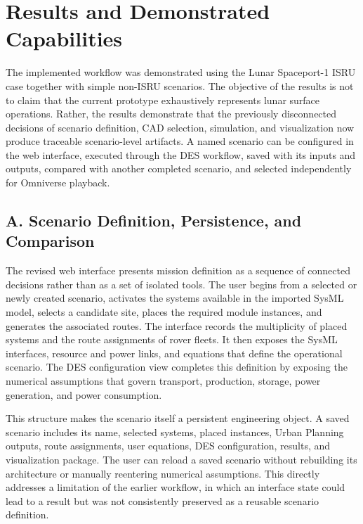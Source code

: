 
\section{Results and Demonstrated Capabilities}

The implemented workflow was demonstrated using the Lunar Spaceport-1 ISRU case together with simple non-ISRU scenarios. The objective of the results is not to claim that the current prototype exhaustively represents lunar surface operations. Rather, the results demonstrate that the previously disconnected decisions of scenario definition, CAD selection, simulation, and visualization now produce traceable scenario-level artifacts. A named scenario can be configured in the web interface, executed through the DES workflow, saved with its inputs and outputs, compared with another completed scenario, and selected independently for Omniverse playback.

\subsection{A. Scenario Definition, Persistence, and Comparison}

The revised web interface presents mission definition as a sequence of connected decisions rather than as a set of isolated tools. The user begins from a selected or newly created scenario, activates the systems available in the imported SysML model, selects a candidate site, places the required module instances, and generates the associated routes. The interface records the multiplicity of placed systems and the route assignments of rover fleets. It then exposes the SysML interfaces, resource and power links, and equations that define the operational scenario. The DES configuration view completes this definition by exposing the numerical assumptions that govern transport, production, storage, power generation, and power consumption.

This structure makes the scenario itself a persistent engineering object. A saved scenario includes its name, selected systems, placed instances, Urban Planning outputs, route assignments, user equations, DES configuration, results, and visualization package. The user can reload a saved scenario without rebuilding its architecture or manually reentering numerical assumptions. This directly addresses a limitation of the earlier workflow, in which an interface state could lead to a result but was not consistently preserved as a reusable scenario definition.

